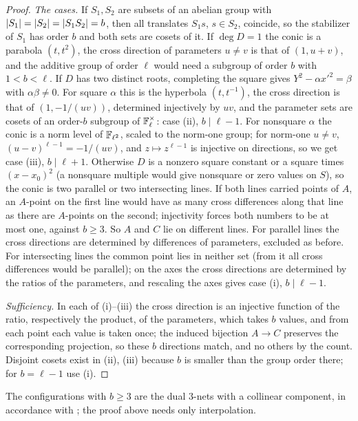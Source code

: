 \begin{proof}
\emph{The cases.} If $S_1,S_2$ are subsets of an abelian group with $\lvert S_1\rvert=\lvert S_2\rvert=\lvert S_1S_2\rvert=b$, then all translates
$S_1s$, $s\in S_2$, coincide, so the stabilizer of $S_1$ has order $b$ and both sets are cosets of it. If $\deg D=1$
the conic is a parabola $(t,t^2)$, the cross direction of parameters $u\ne v$ is that of $(1,u+v)$, and the
additive group of order $\ell$ would need a subgroup of order $b$ with $1<b<\ell$. If $D$ has two distinct roots,
completing the square gives $Y^2-\alpha x'^2=\beta$ with $\alpha\beta\ne0$. For square $\alpha$ this is the hyperbola $(t,t^{-1})$, the
cross direction is that of $(1,-1/(uv))$, determined injectively by $uv$, and the parameter sets are cosets of
an order-$b$ subgroup of $\mathbb{F}_\ell^\times$: case (ii), $b\mid\ell-1$. For nonsquare $\alpha$ the conic is a norm level of
$\mathbb{F}_{\ell^2}$, scaled to the norm-one group; for norm-one $u\ne v$, $(u-v)^{\ell-1}=-1/(uv)$, and $z\mapsto z^{\ell-1}$ is injective on
directions, so we get case (iii), $b\mid\ell+1$. Otherwise $D$ is a nonzero square constant or a square times
$(x-x_0)^2$ (a nonsquare multiple would give nonsquare or zero values on $S$), so the conic is two parallel
or two intersecting lines. If both lines carried points of $A$, an $A$-point on the first line would have
as many cross differences along that line as there are $A$-points on the second; injectivity forces both
numbers to be at most one, against $b\ge3$. So $A$ and $C$ lie on different lines. For parallel lines the
cross directions are determined by differences of parameters, excluded as before. For intersecting lines
the common point lies in neither set (from it all cross differences would be parallel); on the axes the
cross directions are determined by the ratios of the parameters, and rescaling the axes gives case (i),
$b\mid\ell-1$.

\emph{Sufficiency.} In each of (i)--(iii) the cross direction is an injective function of the ratio,
respectively the product, of the parameters, which takes $b$ values, and from each point each value is
taken once; the induced bijection $A\to C$ preserves the corresponding projection, so these $b$ directions
match, and no others by the count. Disjoint cosets exist in (ii), (iii) because $b$ is smaller than the
group order there; for $b=\ell-1$ use (i).
\end{proof}

The configurations with $b\ge3$ are the dual $3$-nets with a collinear component, in accordance with
\cite[Theorem~5.1 and \S5]{BlokhuisKorchmarosMazzocca2011Structure}; the proof above needs only interpolation.

